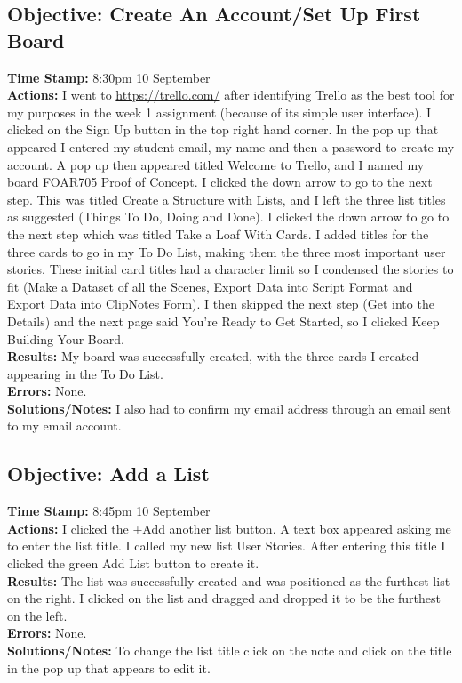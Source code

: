 \documentclass{article}
\begin{document}
\begin{FlushLeft}
\subsection{Objective: Create An Account/Set Up First Board}
\textbf{Time Stamp:} 8:30pm 10 September\\
\textbf{Actions:} I went to \url{https://trello.com/} after identifying Trello as the best tool for my purposes in the week 1 assignment (because of its simple user interface). I clicked on the Sign Up button in the top right hand corner. In the pop up that appeared I entered my student email, my name and then a password to create my account. A pop up then appeared titled Welcome to Trello, and I named my board FOAR705 Proof of Concept. I clicked the down arrow to go to the next step. This was titled Create a Structure with Lists, and I left the three list titles as suggested (Things To Do, Doing and Done). I clicked the down arrow to go to the next step which was titled Take a Loaf With Cards. I added titles for the three cards to go in my To Do List, making them the three most important user stories. These initial card titles had a character limit so I condensed the stories to fit (Make a Dataset of all the Scenes, Export Data into Script Format and Export Data into ClipNotes Form). I then skipped the next step (Get into the Details) and the next page said You're Ready to Get Started, so I clicked Keep Building Your Board.\\
\textbf{Results:} My board was successfully created, with the three cards I created appearing in the To Do List. \\
\textbf{Errors:} None.\\
\textbf{Solutions/Notes:} I also had to confirm my email address through an email sent to my email account.\\

\subsection{Objective: Add a List}
\textbf{Time Stamp:} 8:45pm 10 September\\
\textbf{Actions:} I clicked the +Add another list button. A text box appeared asking me to enter the list title. I called my new list User Stories. After entering this title I clicked the green Add List button to create it. \\
\textbf{Results:} The list was successfully created and was positioned as the furthest list on the right. I clicked on the list and dragged and dropped it to be the furthest on the left. \\
\textbf{Errors:} None.\\
\textbf{Solutions/Notes:} To change the list title click on the note and click on the title in the pop up that appears to edit it.\\


\end{FlushLeft}
\end{document}
